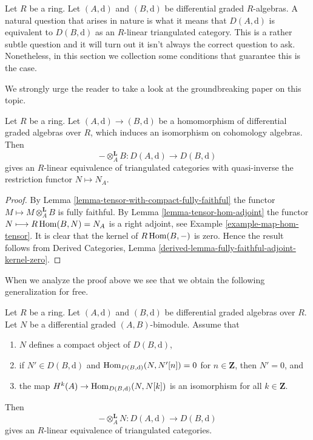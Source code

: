 \noindent
Let $R$ be a ring. Let $(A, \text{d})$ and $(B, \text{d})$ be differential
graded $R$-algebras. A natural question that arises in nature is what
it means that $D(A, \text{d})$ is equivalent to $D(B, \text{d})$
as an $R$-linear triangulated category. This is a rather subtle question
and it will turn out it isn't always the correct question to ask.
Nonetheless, in this section we collection some conditions
that guarantee this is the case.

\medskip\noindent
We strongly urge the reader to take a look at the groundbreaking
paper \cite{Rickard} on this topic.

\begin{lemma}
\label{lemma-qis-equivalence}
Let $R$ be a ring. Let $(A, \text{d}) \to (B, \text{d})$ be a
homomorphism of differential graded algebras over $R$, which induces
an isomorphism on cohomology algebras. Then
$$
- \otimes_A^\mathbf{L} B : D(A, \text{d}) \to D(B, \text{d})
$$
gives an $R$-linear equivalence of triangulated categories with
quasi-inverse the restriction functor $N \mapsto N_A$.
\end{lemma}

\begin{proof}
By Lemma \ref{lemma-tensor-with-compact-fully-faithful}
the functor $M \longmapsto M \otimes_A^\mathbf{L} B$ is
fully faithful. By Lemma \ref{lemma-tensor-hom-adjoint}
the functor $N \longmapsto R\mathop{\mathrm{Hom}}\nolimits(B, N) = N_A$ is a right adjoint, see
Example \ref{example-map-hom-tensor}.
It is clear that the kernel of $R\mathop{\mathrm{Hom}}\nolimits(B, -)$ is zero.
Hence the result follows from
Derived Categories, Lemma
\ref{derived-lemma-fully-faithful-adjoint-kernel-zero}.
\end{proof}

\noindent
When we analyze the proof above we see that we obtain the
following generalization for free.

\begin{lemma}
\label{lemma-tilting-equivalence}
Let $R$ be a ring. Let $(A, \text{d})$ and $(B, \text{d})$ be 
differential graded algebras over $R$. Let $N$ be a
differential graded $(A, B)$-bimodule. Assume that
\begin{enumerate}
\item $N$ defines a compact object of $D(B, \text{d})$,
\item if $N' \in D(B, \text{d})$ and
$\mathop{\mathrm{Hom}}\nolimits_{D(B, \text{d})}(N, N'[n]) = 0$ for $n \in \mathbf{Z}$,
then $N' = 0$, and
\item the map $H^k(A) \to \mathop{\mathrm{Hom}}\nolimits_{D(B, \text{d})}(N, N[k])$ is an
isomorphism for all $k \in \mathbf{Z}$.
\end{enumerate}
Then
$$
- \otimes_A^\mathbf{L} N : D(A, \text{d}) \to D(B, \text{d})
$$
gives an $R$-linear equivalence of triangulated categories.
\end{lemma}

